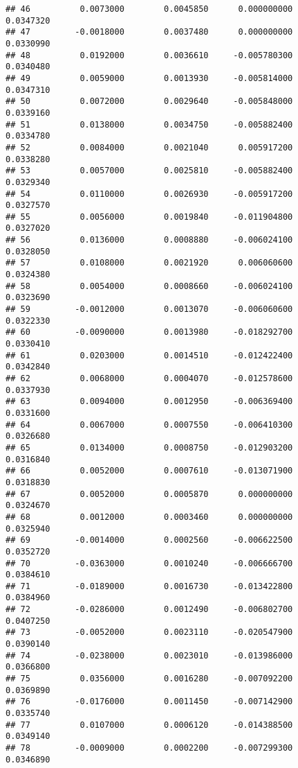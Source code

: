 \documentclass[
]{article}
\begin{document}
\begin{verbatim}
## 46          0.0073000        0.0045850      0.000000000             0.0347320
## 47         -0.0018000        0.0037480      0.000000000             0.0330990
## 48          0.0192000        0.0036610     -0.005780300             0.0340480
## 49          0.0059000        0.0013930     -0.005814000             0.0347310
## 50          0.0072000        0.0029640     -0.005848000             0.0339160
## 51          0.0138000        0.0034750     -0.005882400             0.0334780
## 52          0.0084000        0.0021040      0.005917200             0.0338280
## 53          0.0057000        0.0025810     -0.005882400             0.0329340
## 54          0.0110000        0.0026930     -0.005917200             0.0327570
## 55          0.0056000        0.0019840     -0.011904800             0.0327020
## 56          0.0136000        0.0008880     -0.006024100             0.0328050
## 57          0.0108000        0.0021920      0.006060600             0.0324380
## 58          0.0054000        0.0008660     -0.006024100             0.0323690
## 59         -0.0012000        0.0013070     -0.006060600             0.0322330
## 60         -0.0090000        0.0013980     -0.018292700             0.0330410
## 61          0.0203000        0.0014510     -0.012422400             0.0342840
## 62          0.0068000        0.0004070     -0.012578600             0.0337930
## 63          0.0094000        0.0012950     -0.006369400             0.0331600
## 64          0.0067000        0.0007550     -0.006410300             0.0326680
## 65          0.0134000        0.0008750     -0.012903200             0.0316840
## 66          0.0052000        0.0007610     -0.013071900             0.0318830
## 67          0.0052000        0.0005870      0.000000000             0.0324670
## 68          0.0012000        0.0003460      0.000000000             0.0325940
## 69         -0.0014000        0.0002560     -0.006622500             0.0352720
## 70         -0.0363000        0.0010240     -0.006666700             0.0384610
## 71         -0.0189000        0.0016730     -0.013422800             0.0384960
## 72         -0.0286000        0.0012490     -0.006802700             0.0407250
## 73         -0.0052000        0.0023110     -0.020547900             0.0390140
## 74         -0.0238000        0.0023010     -0.013986000             0.0366800
## 75          0.0356000        0.0016280     -0.007092200             0.0369890
## 76         -0.0176000        0.0011450     -0.007142900             0.0335740
## 77          0.0107000        0.0006120     -0.014388500             0.0349140
## 78         -0.0009000        0.0002200     -0.007299300             0.0346890

\end{verbatim}
\end{document}
